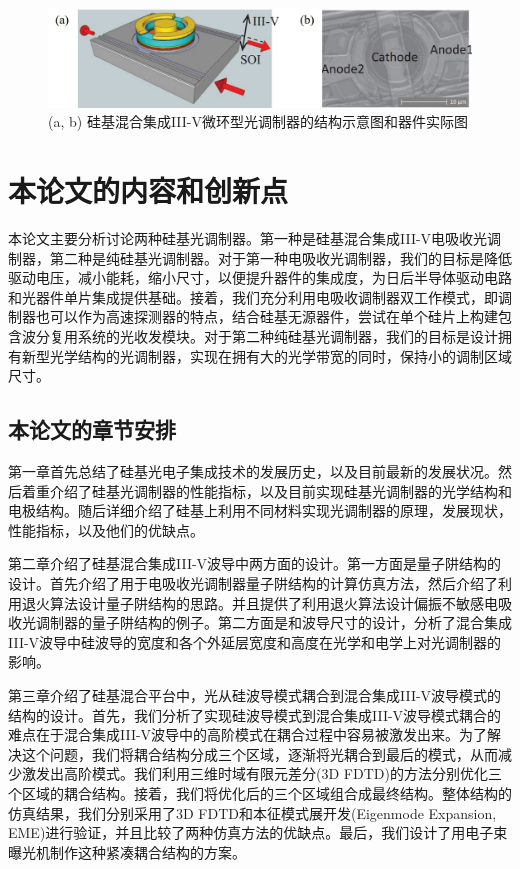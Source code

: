\begin{figure}[htb]
	\centering
	\includegraphics[width=12cm]{./Pictures/fig_eam_ring.jpg}
	\caption{ (a, b) 硅基混合集成III-V微环型光调制器的结构示意图和器件实际图\cite{Srinivasan2012micro}}
	\label{fig_eam_ring}
\end{figure}

\section{本论文的内容和创新点}
本论文主要分析讨论两种硅基光调制器。第一种是硅基混合集成III-V电吸收光调制器，第二种是纯硅基光调制器。对于第一种电吸收光调制器，我们的目标是降低驱动电压，减小能耗，缩小尺寸，以便提升器件的集成度，为日后半导体驱动电路和光器件单片集成提供基础。接着，我们充分利用电吸收调制器双工作模式，即调制器也可以作为高速探测器的特点，结合硅基无源器件，尝试在单个硅片上构建包含波分复用系统的光收发模块。对于第二种纯硅基光调制器，我们的目标是设计拥有新型光学结构的光调制器，实现在拥有大的光学带宽的同时，保持小的调制区域尺寸。

\subsection{本论文的章节安排}
第一章首先总结了硅基光电子集成技术的发展历史，以及目前最新的发展状况。然后着重介绍了硅基光调制器的性能指标，以及目前实现硅基光调制器的光学结构和电极结构。随后详细介绍了硅基上利用不同材料实现光调制器的原理，发展现状，性能指标，以及他们的优缺点。

第二章介绍了硅基混合集成III-V波导中两方面的设计。第一方面是量子阱结构的设计。首先介绍了用于电吸收光调制器量子阱结构的计算仿真方法，然后介绍了利用退火算法设计量子阱结构的思路。并且提供了利用退火算法设计偏振不敏感电吸收光调制器的量子阱结构的例子。第二方面是和波导尺寸的设计，分析了混合集成III-V波导中硅波导的宽度和各个外延层宽度和高度在光学和电学上对光调制器的影响。

第三章介绍了硅基混合平台中，光从硅波导模式耦合到混合集成III-V波导模式的结构的设计。首先，我们分析了实现硅波导模式到混合集成III-V波导模式耦合的难点在于混合集成III-V波导中的高阶模式在耦合过程中容易被激发出来。为了解决这个问题，我们将耦合结构分成三个区域，逐渐将光耦合到最后的模式，从而减少激发出高阶模式。我们利用三维时域有限元差分(3D FDTD)的方法分别优化三个区域的耦合结构。接着，我们将优化后的三个区域组合成最终结构。整体结构的仿真结果，我们分别采用了3D FDTD和本征模式展开发(Eigenmode Expansion, EME)进行验证，并且比较了两种仿真方法的优缺点。最后，我们设计了用电子束曝光机制作这种紧凑耦合结构的方案。


